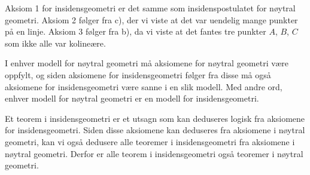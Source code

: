 \begin{oppgave}[3.7.2]
\begin{punkt}
    Aksiom 1 for insidensgeometri er det samme som insidenspostulatet for nøytral geometri. 
    Aksiom 2 følger fra c), der vi viste at det var uendelig mange punkter på en linje.
    Aksiom 3 følger fra b), da vi viste at det fantes tre punkter $A$, $B$, $C$ som ikke alle var kolineære.
    
    I enhver modell for nøytral geometri må aksiomene for nøytral geometri være oppfylt, og siden aksiomene for insidensgeometri følger fra disse må også aksiomene for insidensgeometri være sanne i en slik modell. 
    Med andre ord, enhver modell for nøytral geometri er en modell for insidensgeometri.
\end{punkt}

\begin{punkt}
    Et teorem i insidensgeometri er et utsagn som kan deduseres logisk fra aksiomene for insidensgeometri. 
    Siden disse aksiomene kan deduseres fra aksiomene i nøytral geometri, kan vi også dedusere alle teoremer i insidensgeometri fra aksiomene i nøytral geometri. 
    Derfor er alle teorem i insidensgeometri også teoremer i nøytral geometri. 
\end{punkt}
\end{oppgave}

\begin{oppgave}[4.1.1]
    
\end{oppgave}

\begin{oppgave}[4.2.1]

\end{oppgave}

\begin{oppgave}[4.2.2]

\end{oppgave}

\begin{oppgave}[4.2.4]

\end{oppgave}